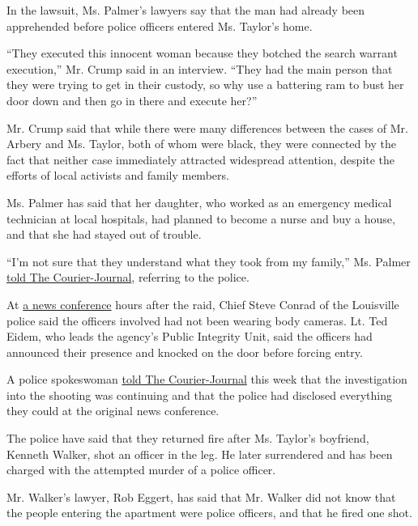 In the lawsuit, Ms. Palmer's lawyers say that the man had already been
apprehended before police officers entered Ms. Taylor's home.

``They executed this innocent woman because they botched the search
warrant execution,'' Mr. Crump said in an interview. ``They had the main
person that they were trying to get in their custody, so why use a
battering ram to bust her door down and then go in there and execute
her?''

Mr. Crump said that while there were many differences between the cases
of Mr. Arbery and Ms. Taylor, both of whom were black, they were
connected by the fact that neither case immediately attracted widespread
attention, despite the efforts of local activists and family members.

Ms. Palmer has said that her daughter, who worked as an emergency
medical technician at local hospitals, had planned to become a nurse and
buy a house, and that she had stayed out of trouble.

``I'm not sure that they understand what they took from my family,'' Ms.
Palmer
\href{https://www.courier-journal.com/story/news/crime/2020/05/12/mother-breonna-taylor-louisville-emt-shot-police-speaks-out/3116777001/}{told
The Courier-Journal}, referring to the police.

At
\href{https://www.facebookcorewwwi.onion/41739947268/videos/206839417221050/}{a
news conference} hours after the raid, Chief Steve Conrad of the
Louisville police said the officers involved had not been wearing body
cameras. Lt. Ted Eidem, who leads the agency's Public Integrity Unit,
said the officers had announced their presence and knocked on the door
before forcing entry.

A police spokeswoman
\href{https://www.courier-journal.com/story/news/crime/2020/05/11/breonna-taylor-killing-family-hires-attorney-ahmaud-arbery-case/3108607001/}{told
The Courier-Journal} this week that the investigation into the shooting
was continuing and that the police had disclosed everything they could
at the original news conference.

The police have said that they returned fire after Ms. Taylor's
boyfriend, Kenneth Walker, shot an officer in the leg. He later
surrendered and has been charged with the attempted murder of a police
officer.

Mr. Walker's lawyer, Rob Eggert, has said that Mr. Walker did not know
that the people entering the apartment were police officers, and that he
fired one shot.


